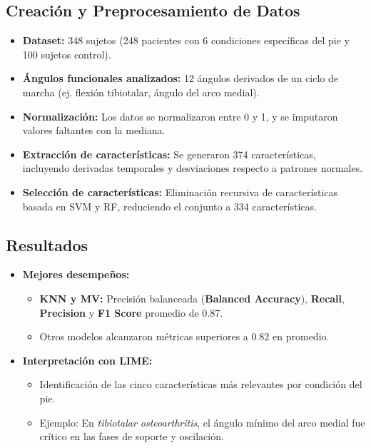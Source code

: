 \documentclass{report}
\begin{document}
\subsection{Creación y Preprocesamiento de Datos}
\begin{itemize}
    \item \textbf{Dataset:} 348 sujetos (248 pacientes con 6 condiciones específicas del pie y 100 sujetos control).
    \item \textbf{Ángulos funcionales analizados:} 12 ángulos derivados de un ciclo de marcha (ej. flexión tibiotalar, ángulo del arco medial).
    \item \textbf{Normalización:} Los datos se normalizaron entre 0 y 1, y se imputaron valores faltantes con la mediana.
    \item \textbf{Extracción de características:} Se generaron 374 características, incluyendo derivadas temporales y desviaciones respecto a patrones normales.
    \item \textbf{Selección de características:} Eliminación recursiva de características basada en SVM y RF, reduciendo el conjunto a 334 características.
\end{itemize}

\subsection{Resultados}
\begin{itemize}
    \item \textbf{Mejores desempeños:}
    \begin{itemize}
        \item \textbf{KNN y MV:} Precisión balanceada (\textbf{Balanced Accuracy}), \textbf{Recall}, \textbf{Precision} y \textbf{F1 Score} promedio de 0.87.
        \item Otros modelos alcanzaron métricas superiores a 0.82 en promedio.
    \end{itemize}
    \item \textbf{Interpretación con LIME:}
    \begin{itemize}
        \item Identificación de las cinco características más relevantes por condición del pie.
        \item Ejemplo: En \textit{tibiotalar osteoarthritis}, el ángulo mínimo del arco medial fue crítico en las fases de soporte y oscilación.
    \end{itemize}
\end{itemize}
\end{document}
